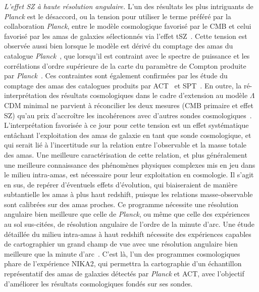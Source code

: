 \emph{L'effet SZ à haute résolution angulaire.} L'un des résultats les plus
intriguants de \emph{Planck} est le désaccord, ou la \og tension \fg
pour utiliser le terme préféré par la collaboration \emph{Planck},
entre le modèle cosmologique favorisé par le CMB et celui favorisé
par les amas de galaxies sélectionnés via l'effet
tSZ~. Cette tension est observée aussi
bien lorsque le modèle est dérivé du comptage des amas du
catalogue \emph{Planck}~, que lorsqu'il est 
contraint avec le spectre de puissance et les corrélations d'ordre
supérieure de la carte du paramètre de Compton produite
par \emph{Planck}~. Ces contraintes sont également
confirmées par les étude du comptage des amas des catalogues produits
par ACT~ et SPT~. En outre, la
ré-interprétation des résultats cosmologiques dans le cadre
d’extension au modèle $\Lambda$CDM minimal
ne parvient à réconcilier les deux mesures (CMB primaire et effet SZ)
qu’au prix d’accroître les incohérences avec d’autres sondes cosmologiques~.
L’interprétation favorisée à ce jour pour cette tension est un effet
systématique entâchant l’exploitation des amas de galaxie en tant que
sonde cosmologique, et qui serait lié à l’incertitude sur la relation
entre l’observable et la masse totale des amas. Une meilleure
caractérisation de cette relation, et plus généralement une meilleure
connaissance des phénomènes physiques complexes mis en jeu dans le
milieu intra-amas, est nécessaire pour leur exploitation en cosmologie. 
Il s’agit en sus, de repérer d’éventuels effets d’évolution, qui
biaiseraient de manière subtantielle les amas à plus haut redshift,
puisque les relations masse-observable sont calibrées sur des amas
proches. Ce programme nécessite une résolution angulaire bien
meilleure que celle de \emph{Planck}, ou même que celle des
expériences au sol sus-citées, de résolution angulaire de l'ordre de
la minute d'arc. Une étude détaillée du milieu intra-amas à haut
redshift nécessite des expériences capables de cartographier un grand
champ de vue avec une résolution angulaire bien meilleure que la
minute d'arc~. C’est là, l’un des programmes
cosmologiques phare de l’expérience NIKA2, qui permettra la
cartographie d’un échantillon représentatif des amas de galaxies
détectés par \emph{Planck} et ACT, avec l’objectif d’améliorer les
résultats cosmologiques fondés sur ses sondes.\\

